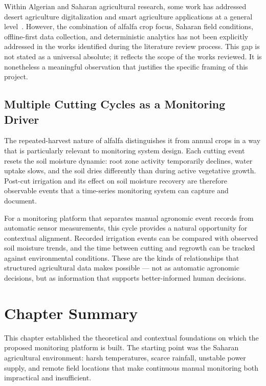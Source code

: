 Within Algerian and Saharan agricultural research, some work has addressed desert
agriculture digitalization and smart agriculture applications at a general
level~\cite{iot_enhancements_algerian_desert_agriculture}.
However, the combination of alfalfa crop focus, Saharan field conditions,
offline-first data collection, and deterministic analytics has not been
explicitly addressed in the works identified during the literature review
process. This gap is not stated as a universal absolute; it reflects the scope
of the works reviewed. It is nonetheless a meaningful observation that justifies
the specific framing of this project.

\subsection{Multiple Cutting Cycles as a Monitoring Driver}
\label{subsec:alfalfa-cycles}

The repeated-harvest nature of alfalfa distinguishes it from annual crops in a
way that is particularly relevant to monitoring system design. Each cutting event
resets the soil moisture dynamic: root zone activity temporarily declines, water
uptake slows, and the soil dries differently than during active vegetative growth.
Post-cut irrigation and its effect on soil moisture recovery are therefore
observable events that a time-series monitoring system can capture and document.

For a monitoring platform that separates manual agronomic event records from
automatic sensor measurements, this cycle provides a natural opportunity for
contextual alignment. Recorded irrigation events can be compared with observed
soil moisture trends, and the time between cutting and regrowth can be tracked
against environmental conditions. These are the kinds of relationships that
structured agricultural data makes possible — not as automatic agronomic
decisions, but as information that supports better-informed human decisions.

\section{Chapter Summary}
\label{sec:ch1-summary}

This chapter established the theoretical and contextual foundations on which the
proposed monitoring platform is built. The starting point was the Saharan
agricultural environment: harsh temperatures, scarce rainfall, unstable power
supply, and remote field locations that make continuous manual monitoring both
impractical and insufficient.

